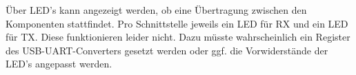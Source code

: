 Über LED's kann angezeigt werden, ob eine Übertragung zwischen den Komponenten stattfindet. Pro Schnittstelle jeweils ein LED für RX und ein LED für TX. Diese funktionieren leider nicht. Dazu müsste wahrscheinlich ein Register des USB-UART-Converters gesetzt werden oder ggf. die Vorwiderstände der LED's angepasst werden.